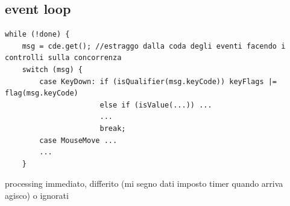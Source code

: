 \documentclass[10pt]{article}
\begin{document}
\subsection{event loop}
\begin{verbatim}
while (!done) {
    msg = cde.get(); //estraggo dalla coda degli eventi facendo i controlli sulla concorrenza
    switch (msg) {
        case KeyDown: if (isQualifier(msg.keyCode)) keyFlags |= flag(msg.keyCode)
                      else if (isValue(...)) ...
                      ...
                      break;
        case MouseMove ...
        ...
    }		
\end{verbatim}
processing immediato, differito (mi segno dati imposto timer quando arriva agisco) o ignorati\\
\end{document}
